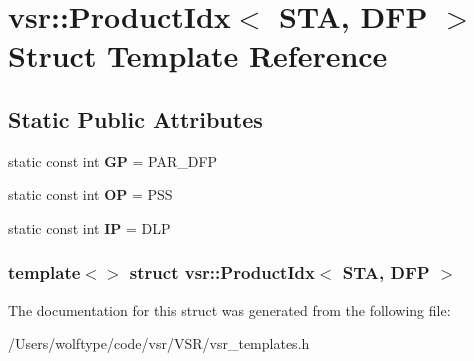 \hypertarget{structvsr_1_1_product_idx_3_01_s_t_a_00_01_d_f_p_01_4}{\section{vsr\-:\-:Product\-Idx$<$ S\-T\-A, D\-F\-P $>$ Struct Template Reference}
\label{structvsr_1_1_product_idx_3_01_s_t_a_00_01_d_f_p_01_4}
}
\subsection*{Static Public Attributes}
\begin{DoxyCompactItemize}
\item 
\hypertarget{structvsr_1_1_product_idx_3_01_s_t_a_00_01_d_f_p_01_4_adc75639e47d32111b13c618aa1603fb7}{static const int {\bfseries G\-P} = P\-A\-R\-\_\-\-D\-F\-P}\label{structvsr_1_1_product_idx_3_01_s_t_a_00_01_d_f_p_01_4_adc75639e47d32111b13c618aa1603fb7}

\item 
\hypertarget{structvsr_1_1_product_idx_3_01_s_t_a_00_01_d_f_p_01_4_a61ea8dabb5fbd6d31fb4e19fc3588564}{static const int {\bfseries O\-P} = P\-S\-S}\label{structvsr_1_1_product_idx_3_01_s_t_a_00_01_d_f_p_01_4_a61ea8dabb5fbd6d31fb4e19fc3588564}

\item 
\hypertarget{structvsr_1_1_product_idx_3_01_s_t_a_00_01_d_f_p_01_4_ae2e07ddcb1be6cfd2bd74c74401ce477}{static const int {\bfseries I\-P} = D\-L\-P}\label{structvsr_1_1_product_idx_3_01_s_t_a_00_01_d_f_p_01_4_ae2e07ddcb1be6cfd2bd74c74401ce477}

\end{DoxyCompactItemize}
\subsubsection*{template$<$$>$ struct vsr\-::\-Product\-Idx$<$ S\-T\-A, D\-F\-P $>$}



The documentation for this struct was generated from the following file\-:\begin{DoxyCompactItemize}
\item 
/\-Users/wolftype/code/vsr/\-V\-S\-R/vsr\-\_\-templates.\-h\end{DoxyCompactItemize}
